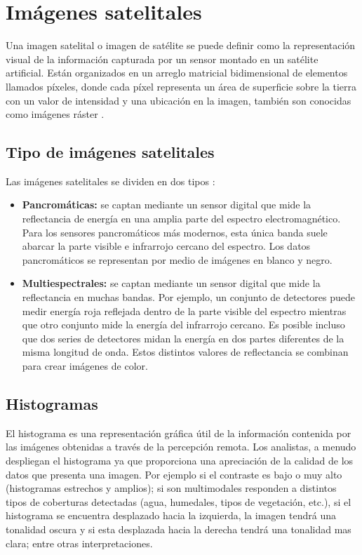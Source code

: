 \section{Im\'agenes satelitales}
Una imagen satelital o imagen de sat\'elite se puede definir como la representaci\'on visual de la informaci\'on capturada por un sensor montado en un sat\'elite artificial. Est\'an organizados en un arreglo matricial bidimensional de elementos llamados p\'ixeles, donde cada p\'ixel representa un \'area de superficie sobre la tierra con un valor de intensidad y una ubicación en la imagen, tambi\'en son conocidas como im\'agenes r\'aster \cite{acosta2003experiencia}. 

\subsection{Tipo de im\'agenes satelitales}
Las im\'agenes satelitales se dividen en dos tipos \cite{salinero2002teledeteccion}:
	\begin{itemize}
		\item \textbf{Pancrom\'aticas:} se captan mediante un sensor digital que mide la reflectancia de energ\'ia en una amplia parte del espectro electromagn\'etico. Para los sensores pancrom\'aticos m\'as modernos, esta \'unica banda suele abarcar la parte visible e infrarrojo cercano del espectro. Los datos pancrom\'aticos se representan por medio de im\'agenes en blanco y negro. 
		\item \textbf{Multiespectrales:} se captan mediante un sensor digital que mide la reflectancia en muchas bandas. Por ejemplo, un conjunto de detectores puede medir energ\'ia roja reflejada dentro de la parte visible del espectro mientras que otro conjunto mide la energ\'ia del infrarrojo cercano. Es posible incluso que dos series de detectores midan la energ\'ia en dos partes diferentes de la misma longitud de onda. Estos distintos valores de reflectancia se combinan para crear im\'agenes de color.

	\end{itemize}

\subsection{Histogramas}
El histograma es una representaci\'on gr\'afica \'util de la informaci\'on contenida por las im\'agenes obtenidas a trav\'es de la percepci\'on remota. Los analistas, a menudo despliegan el histograma ya que proporciona una apreciaci\'on de la calidad de los datos que presenta una imagen. Por ejemplo si el contraste es bajo o muy alto (histogramas estrechos y amplios); si son multimodales responden a distintos tipos de coberturas detectadas (agua, humedales, tipos de vegetaci\'on, etc.), si el histograma se encuentra desplazado hacia la izquierda, la imagen tendr\'a una tonalidad oscura y si esta desplazada hacia la derecha tendr\'a una tonalidad mas clara; entre otras interpretaciones.

